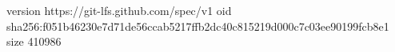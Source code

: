 version https://git-lfs.github.com/spec/v1
oid sha256:f051b46230e7d71de56ccab5217ffb2dc40c815219d000c7c03ee90199fcb8e1
size 410986

